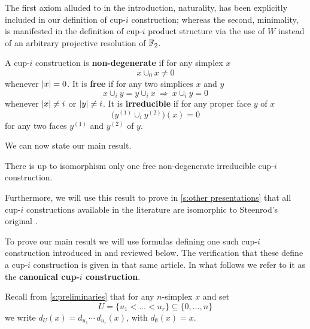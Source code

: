 The first axiom alluded to in the introduction, naturality, has been explicitly included in our definition of cup-$i$ construction; whereas the second, minimality, is manifested in the definition of cup-$i$ product structure via the use of $W$ instead of an arbitrary projective resolution of ${\mathbb{F}_2}$.

\begin{definition}
	A cup-$i$ construction is \textbf{non-degenerate} if for any simplex $x$
	\[
	\boxed{x \cup_0 x \neq 0}
	\]
	whenever $\lvert x\rvert = 0$.
	It is \textbf{free} if for any two simplices $x$ and $y$
	\[
	\boxed{x \cup_{i} y = y \cup_{i} x} \
	\Longrightarrow \
	\boxed{x \cup_{i} y = 0}
	\]
	whenever $\lvert x\rvert \neq i$ or $\lvert y\rvert \neq i$.
	It is \textbf{irreducible} if for any proper face $y$ of $x$
	\[
	\boxed{\Big( y^{(1)} \cup_{i} y^{(2)} \Big)(x) = 0}
	\]
	for any two faces $y^{(1)}$ and $y^{(2)}$ of $y$.
\end{definition}

We can now state our main result.

\begin{theorem} \label{t:main}
	There is up to isomorphism only one free non-degenerate irreducible cup-$i$ construction.
\end{theorem}

Furthermore, we will use this result to prove in \cref{s:other presentations} that all cup-$i$ constructions available in the literature are isomorphic to Steenrod's original \cite{steenrod1947products}.

To prove our main result we will use formulas defining one such cup-$i$ construction introduced in \cite{medina2021newformulas} and reviewed below.
The verification that these define a cup-$i$ construction is given in that same article.
In what follows we refer to it as the \textbf{canonical cup-$i$ construction}.

Recall from \cref{s:preliminaries} that for any $n$-simplex $x$ and set
\begin{equation*}
U = \{u_1 < \dots < u_r\} \subseteq \big\{ 0, \dots, n \big\}
\end{equation*}
we write $d_U(x) = d_{u_1}\! \dotsm \, d_{u_r}(x)$, with $d_{\emptyset}(x) = x$.

